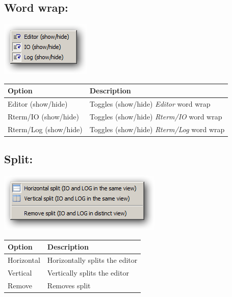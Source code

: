 \hypertarget{menu_view_wordwrap}{}
\subsection{Word wrap:}

\includegraphics[scale=0.50]{./res/menu_view_linewrap.png}\\

\begin{scriptsize}\begin{tabularx}{\textwidth}{>{\hsize=0.3\hsize}X>{\hsize=0.7\hsize}X}\\
    \hline
    \textbf{Option} & \textbf{Description} \\
    \hline
    Editor (show/hide) & Toggles (show/hide) \textit{Editor} word wrap \\
    Rterm/IO (show/hide) & Toggles (show/hide) \textit{Rterm/IO} word wrap \\
    Rterm/Log (show/hide) & Toggles (show/hide) \textit{Rterm/Log} word wrap \\
    \hline
  \end{tabularx}\end{scriptsize}


\hypertarget{menu_view_split}{}
\subsection{Split:}

\includegraphics[scale=0.50]{./res/menu_view_split.png}\\

\begin{scriptsize}\begin{tabularx}{\textwidth}{>{\hsize=0.3\hsize}X>{\hsize=0.7\hsize}X}\\
    \hline
    \textbf{Option} & \textbf{Description} \\
    \hline
    Horizontal & Horizontally splits the editor \\
    Vertical & Vertically splits the editor \\
    Remove & Removes split \\
    \hline
  \end{tabularx}\end{scriptsize}


